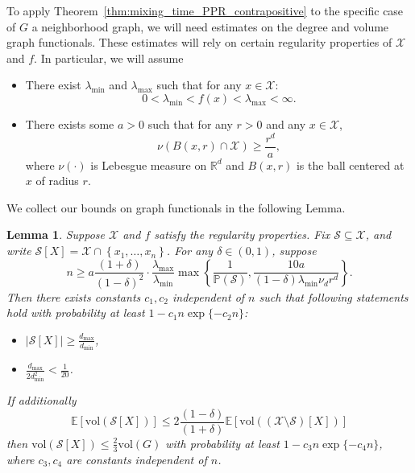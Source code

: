 \documentclass{article}
\newcommand{\Reals}{\mathbb{R}}
\newcommand{\abs}[1]{\left \lvert #1 \right \rvert}
\newcommand{\vol}{\mathrm{vol}}
\newcommand{\set}[1]{\left\{#1\right\}}
\newcommand{\Pbb}{\mathbb{P}}
\newcommand{\1}{\mathbf{1}}
\theoremstyle{alden}
\theoremstyle{aldenthm}
\newtheorem{lemma}{Lemma}
\theoremstyle{remark}
\begin{document}
To apply Theorem~\ref{thm:mixing_time_PPR_contrapositive} to the specific case of $G$ a neighborhood graph, we will need estimates on the degree and volume graph functionals. These estimates will rely on certain regularity properties of $\mathcal{X}$ and $f$. In particular, we will assume
\begin{itemize}
	\label{asmp:regularity_conditions}
	\item There exist $\lambda_{\min}$ and $\lambda_{\max}$ such that for any $x \in \mathcal{X}$:
	\begin{equation*}
	0 < \lambda_{\min} < f(x) < \lambda_{\max} < \infty.
	\end{equation*}
	\item There exists some $a > 0$ such that for any $r >0 $ and any $x \in \mathcal{X}$,
	\begin{equation*}
	\nu(B(x,r) \cap \mathcal{X}) \geq \frac{r^d}{a},
	\end{equation*}
	where $\nu(\cdot)$ is Lebesgue measure on $\Reals^d$ and $B(x,r)$ is the ball centered at $x$ of radius $r$. 
\end{itemize}
We collect our bounds on graph functionals in the following Lemma.
\begin{lemma}
	\label{lem:graph_functional_concentration}
	Suppose $\mathcal{X}$ and $f$ satisfy the regularity properties. Fix $\mathcal{S} \subseteq \mathcal{X}$, and write $\mathcal{S}[X] = \mathcal{X} \cap \set{x_1,\ldots,x_n}$.  For any $\delta \in (0,1)$, suppose
	\begin{equation}
	\label{eqn:graph_functional_concentration_1}
	n \geq a \frac{(1 + \delta)}{(1 - \delta)^2} \cdot \frac{\lambda_{\max}}{\lambda_{\min}} \max\set{\frac{1}{\Pbb(\mathcal{S})}, \frac{10a}{(1-\delta)\lambda_{\min}\nu_dr^d}}.
	\end{equation}
	Then there exists constants $c_1,c_2$ independent of $n$ such that following statements hold with probability at least $1 - c_1n\exp\{-c_2n\}$:
	\begin{itemize}
		\item $\abs{\mathcal{S}[X]} \geq \frac{d_{\max}}{d_{\min}}$, 
		\item $\frac{d_{\max}}{2d_{\min}^2} < \frac{1}{20}$. 
	\end{itemize}
	If additionally
	\begin{equation}
	\label{eqn:graph_functional_concentration_2}
	\mathbb{E}[\vol(\mathcal{S}[X])] \leq 2\frac{(1 - \delta)}{(1 + \delta)} \mathbb{E}[\vol((\mathcal{X}\setminus\mathcal{S})[X])]
	\end{equation}
	then $\vol(\mathcal{S}[X]) \leq \frac{2}{3} \vol(G)$ with probability at least $1 - c_3n\exp\{-c_4n\}$, where $c_3,c_4$ are constants independent of $n$. 
\end{lemma}
\end{document}

